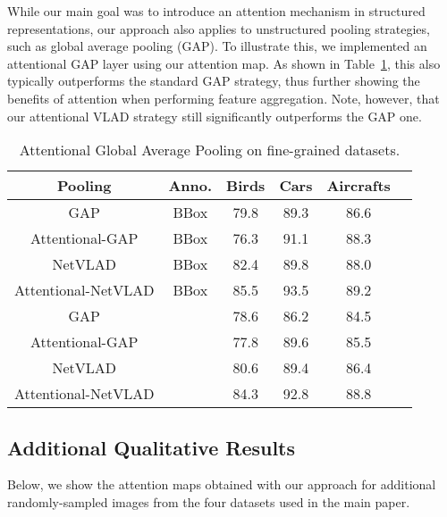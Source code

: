 \documentclass{bmvc2k}
\begin{document}
While our main goal was to introduce an attention mechanism in structured representations, our approach also applies to unstructured pooling strategies, such as global average pooling (GAP). To illustrate this, we implemented an attentional GAP layer using our attention map. As shown in Table~\ref{tab:GAP_results}, this also typically outperforms the standard GAP strategy, thus further showing the benefits of attention when performing feature aggregation. Note, however, that our attentional VLAD strategy still significantly outperforms the GAP one.

\begin{table}[h]
	\small
	\centering
	\begin{tabular}{|c|c|c|c|c|c|}
		\hline
		Pooling             & Anno.      & Birds & Cars & Aircrafts\\
		\hline
		GAP              & BBox       & 79.8 & 89.3 & 86.6  \\     
		Attentional-GAP  & BBox       & 76.3 & 91.1 & 88.3   \\
				NetVLAD             & BBox       & 82.4 & 89.8 & 88.0   \\     
		Attentional-NetVLAD  & BBox   & 85.5 & 93.5 &89.2    \\          
			\hline
		GAP              &            & 78.6 & 86.2 & 84.5  \\     
		Attentional-GAP  &            & 77.8 & 89.6 & 85.5   \\  
		NetVLAD             &            & 80.6 & 89.4 & 86.4  \\     
		Attentional-NetVLAD  &        & 84.3 & 92.8 & 88.8   \\        
		\hline
		
	\end{tabular}
	\vspace{0.1in}
	\caption{\label{tab:GAP_results} Attentional Global Average Pooling on fine-grained datasets.}
\end{table}\newpage\subsection{Additional Qualitative Results}
Below, we show the attention maps obtained with our approach for additional randomly-sampled images from the four datasets used in the main paper.
\end{document}
